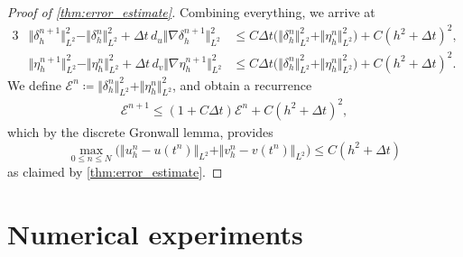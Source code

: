 \documentclass[11pt, a4paper]{amsart}
\numberwithin{equation}{section}
\begin{document}
\begin{proof}[Proof of \cref{thm:error_estimate}]
		Combining everything, we arrive at
		\begin{alignat*}{3}
				&\Vert \delta_h^{n+1}\Vert_{L^2}^2 -  \Vert \delta_h^{n}\Vert_{L^2}^2 + \Delta t\, d_u \Vert \nabla \delta_h^{n+1}\Vert_{L^2}^2 &\leq    C\Delta t\big( \Vert \delta_h^{n}\Vert_{L^2}^2 + \Vert \eta_h^{n}\Vert_{L^2}^2 \big) + C(h^2 + \Delta t)^2,
			\\
				&\Vert \eta_h^{n+1}\Vert_{L^2}^2 - \Vert \eta_h^{n}\Vert_{L^2}^2 + \Delta t \,d_v \Vert \nabla \eta_h^{n+1}\Vert_{L^2}^2 &\leq   C\Delta t\big( \Vert \delta_h^{n}\Vert_{L^2}^2 + \Vert \eta_h^{n}\Vert_{L^2}^2 \big) + C(h^2 + \Delta t)^2.
			\end{alignat*}
		We define $\mathcal{E}^n\coloneqq \Vert \delta_h^{n}\Vert_{L^2}^2 + \Vert \eta_h^{n}\Vert_{L^2}^2$, and obtain a recurrence
		\begin{align*}
			\mathcal{E}^{n+1}\leq (1 + C\Delta t)\mathcal{E}^n + C(h^2 + \Delta t)^2,
		\end{align*}
		which by the discrete Gronwall lemma, provides
		\begin{equation*}
			\max_{0\leq n\leq N} \Big(\Vert u_h^n - u(t^n) \Vert_{L^2} + \Vert v_h^n - v(t^n) \Vert_{L^2}\Big)\leq C(h^2 + \Delta t)
		\end{equation*}
		as claimed by \cref{thm:error_estimate}.
	\end{proof}
	
	
	
	\section{Numerical experiments}\label{sec:numerics}
	
\end{document}
